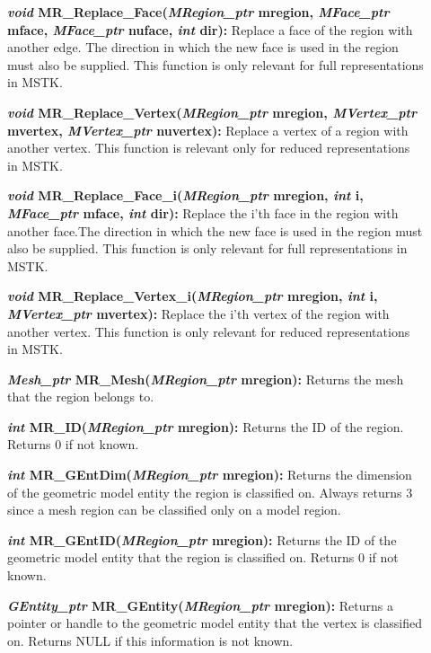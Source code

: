 \documentclass[12pt]{article}
\begin{document}
\begin{description}
\item[]\textbf{\textit{void} MR\_Replace\_Face(\textit{MRegion\_ptr}
mregion, \textit{MFace\_ptr} mface, \textit{MFace\_ptr} nuface,
\textit{int} dir):} Replace a face of the region with another edge. The
direction in which the new face is used in the region must also be
supplied. This function is only relevant for full representations in
MSTK.

\item[]\textbf{\textit{void} MR\_Replace\_Vertex(\textit{MRegion\_ptr}
mregion, \textit{MVertex\_ptr} mvertex, \textit{MVertex\_ptr}
nuvertex):} Replace a vertex of a region with another vertex. This
function is relevant only for reduced representations in MSTK.

\item[]\textbf{\textit{void} MR\_Replace\_Face\_i(\textit{MRegion\_ptr}
mregion, \textit{int} i, \textit{MFace\_ptr} mface, \textit{int} dir):}
Replace the i'th face in the region with another face.The direction in
which the new face is used in the region must also be supplied. This
function is only relevant for full representations in MSTK.

\item[]\textbf{\textit{void} MR\_Replace\_Vertex\_i(\textit{MRegion\_ptr}
mregion, \textit{int} i, \textit{MVertex\_ptr} mvertex):} Replace the
i'th vertex of the region with another vertex. This function is only
relevant for reduced representations in MSTK.


\item[]\textbf{\textit{Mesh\_ptr} MR\_Mesh(\textit{MRegion\_ptr} mregion):}
Returns the mesh that the region belongs to.

\item[]\textbf{\textit{int} MR\_ID(\textit{MRegion\_ptr} mregion):} Returns
the ID of the region. Returns 0 if not known.

\item[]\textbf{\textit{int} MR\_GEntDim(\textit{MRegion\_ptr} mregion):}
Returns the dimension of the geometric model entity the region is
classified on. Always returns 3 since a mesh region can be classified
only on a model region.

\item[]\textbf{\textit{int} MR\_GEntID(\textit{MRegion\_ptr} mregion):}
Returns the ID of the geometric model entity that the region is
classified on. Returns 0 if not known.

\item[]\textbf{\textit{GEntity\_ptr} MR\_GEntity(\textit{MRegion\_ptr}
  mregion):} Returns a pointer or handle to the geometric model entity
  that the vertex is classified on. Returns NULL if this information
  is not known.


\end{description}
\end{document}
